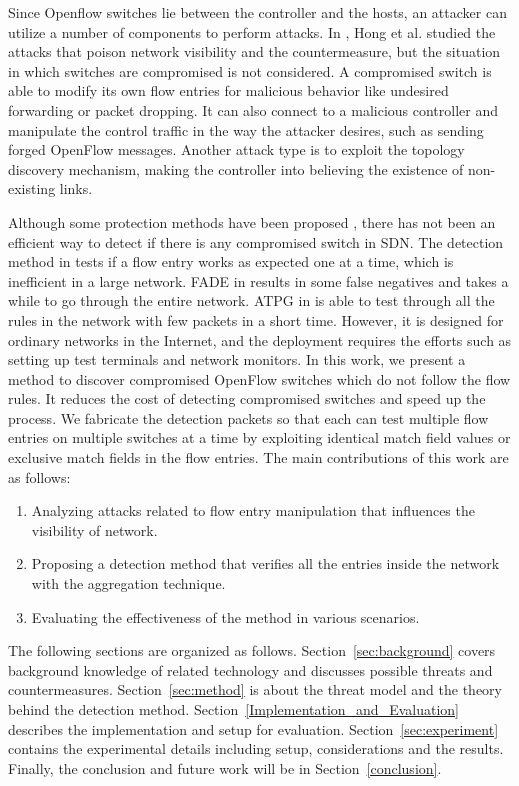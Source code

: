 \documentclass[conference]{IEEEtran}
\begin{document}
Since Openflow switches lie between the controller and the hosts, an attacker can utilize a number of components to perform attacks. In \cite{HXWG15}, Hong et al. studied the attacks that poison network visibility and the countermeasure, but the situation in which switches are compromised is not considered. A compromised switch is able to modify its own flow entries for malicious behavior like undesired forwarding or packet dropping. It can also connect to a malicious controller and manipulate the control traffic in the way the attacker desires, such as sending forged OpenFlow messages. Another attack type is to exploit the topology discovery mechanism, making the controller into believing the existence of non-existing links.

Although some protection methods have been proposed \cite{CKGL15,PJL16}, there has not been an efficient way to detect if there is any compromised switch in SDN. The detection method in \cite{CKGL15} tests if a flow entry works as expected one at a time, which is inefficient in a large network. FADE in \cite{PJL16} results in some false negatives and takes a while to go through the entire network. ATPG in \cite{ZKVM12} is able to test through all the rules in the network with few packets in a short time. However, it is designed for ordinary networks in the Internet, and the deployment requires the efforts such as setting up test terminals and network monitors. In this work, we present a method to discover compromised OpenFlow switches which do not follow the flow rules. It reduces the cost of detecting compromised switches and speed up the process. We fabricate the detection packets so that each can test multiple flow entries on multiple switches at a time by exploiting identical match field values or exclusive match fields in the flow entries. The main contributions of this work are as follows:

\begin{enumerate}
\item
Analyzing attacks related to flow entry manipulation that influences the visibility of network.
\item
Proposing a detection method that verifies all the entries inside the network with the aggregation technique.
\item
Evaluating the effectiveness of the method in various scenarios.
\end{enumerate}

The following sections are organized as follows. Section~\ref{sec:background} covers background knowledge of related technology and discusses possible threats and countermeasures. Section~\ref{sec:method} is about the threat model and the theory behind the detection method. Section~\ref{Implementation_and_Evaluation} describes the implementation and setup for evaluation. Section~\ref{sec:experiment} contains the experimental details including setup, considerations and the results. Finally, the conclusion and future work will be in Section~\ref{conclusion}.
\end{document}
